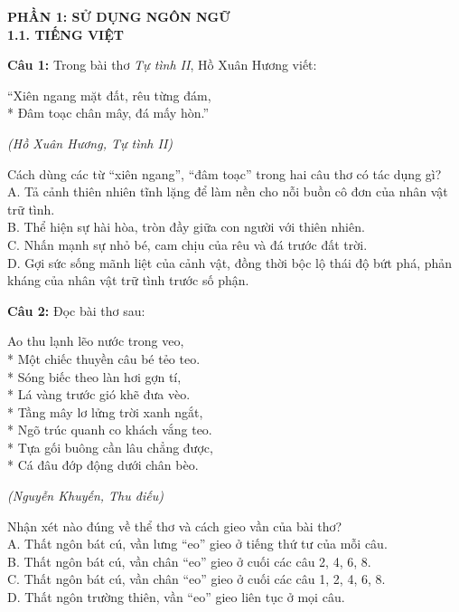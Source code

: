 \documentclass[12pt,a4paper]{article}
\begin{document}
\textbf{PHẦN 1: SỬ DỤNG NGÔN NGỮ\\ 1.1. TIẾNG VIỆT} \textit{}

\makeatletter{}  \makeatother



\noindent \textbf{Câu 1:} Trong bài thơ \textit{Tự tình II}, Hồ Xuân Hương viết:
\begin{center}
``Xiên ngang mặt đất, rêu từng đám,\\*
Đâm toạc chân mây, đá mấy hòn.''
\end{center}
\begin{flushright}\small\textit{(Hồ Xuân Hương, Tự tình II)}\end{flushright}
Cách dùng các từ ``xiên ngang'', ``đâm toạc'' trong hai câu thơ có tác dụng gì?\\
\noindent A. Tả cảnh thiên nhiên tĩnh lặng để làm nền cho nỗi buồn cô đơn của nhân vật trữ tình.\\
\noindent B. Thể hiện sự hài hòa, tròn đầy giữa con người với thiên nhiên.\\
\noindent C. Nhấn mạnh sự nhỏ bé, cam chịu của rêu và đá trước đất trời.\\
\noindent D. Gợi sức sống mãnh liệt của cảnh vật, đồng thời bộc lộ thái độ bứt phá, phản kháng của nhân vật trữ tình trước số phận.



\vspace{0.3cm}

\noindent \textbf{Câu 2:} Đọc bài thơ sau:
\begin{center}
Ao thu lạnh lẽo nước trong veo,\\*
Một chiếc thuyền câu bé tẻo teo.\\*
Sóng biếc theo làn hơi gợn tí,\\*
Lá vàng trước gió khẽ đưa vèo.\\*
Tầng mây lơ lửng trời xanh ngắt,\\*
Ngõ trúc quanh co khách vắng teo.\\*
Tựa gối buông cần lâu chẳng được,\\*
Cá đâu đớp động dưới chân bèo.
\end{center}
\begin{flushright}\small\textit{(Nguyễn Khuyến, Thu điếu)}\end{flushright}
Nhận xét nào đúng về thể thơ và cách gieo vần của bài thơ?\\
\noindent A. Thất ngôn bát cú, vần lưng ``eo'' gieo ở tiếng thứ tư của mỗi câu.\\
\noindent B. Thất ngôn bát cú, vần chân ``eo'' gieo ở cuối các câu 2, 4, 6, 8.\\
\noindent C. Thất ngôn bát cú, vần chân ``eo'' gieo ở cuối các câu 1, 2, 4, 6, 8.\\
\noindent D. Thất ngôn trường thiên, vần ``eo'' gieo liên tục ở mọi câu.
\end{document}
